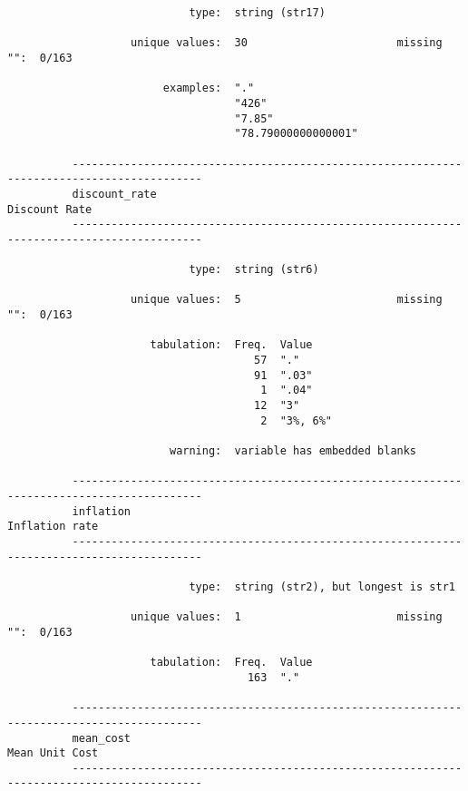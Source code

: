 \documentclass{article}
\begin{document}
\begin{verbatim}
                            type:  string (str17)
          
                   unique values:  30                       missing "":  0/163
          
                        examples:  "."
                                   "426"
                                   "7.85"
                                   "78.79000000000001"
          
          ------------------------------------------------------------------------------------------
          discount_rate                                                                Discount Rate
          ------------------------------------------------------------------------------------------
          
                            type:  string (str6)
          
                   unique values:  5                        missing "":  0/163
          
                      tabulation:  Freq.  Value
                                      57  "."
                                      91  ".03"
                                       1  ".04"
                                      12  "3"
                                       2  "3%, 6%"
          
                         warning:  variable has embedded blanks
          
          ------------------------------------------------------------------------------------------
          inflation                                                                   Inflation rate
          ------------------------------------------------------------------------------------------
          
                            type:  string (str2), but longest is str1
          
                   unique values:  1                        missing "":  0/163
          
                      tabulation:  Freq.  Value
                                     163  "."
          
          ------------------------------------------------------------------------------------------
          mean_cost                                                                   Mean Unit Cost
          ------------------------------------------------------------------------------------------
          

\end{verbatim}
\end{document}
